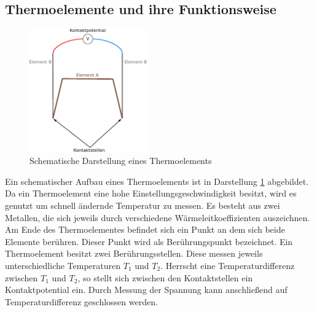 \subsection{Thermoelemente und ihre Funktionsweise} %
\begin{figure}
  \centering
  \includegraphics[width=0.45\textwidth]{bilder/thermoelement.pdf}
  \caption{Schematische Darstellung eines Thermoelements}
  \label{fig:thermo}
\end{figure}
Ein schematischer Aufbau eines Thermoelements ist in  Darstellung \ref{fig:thermo} %
abgebildet.
Da ein Thermoelement eine hohe Einstellungsgeschwindigkeit besitzt,
wird es genutzt um schnell ändernde Temperatur zu messen. %
Es besteht aus zwei Metallen, die sich jeweils durch
verschiedene Wärmeleitkoeffizienten auszeichnen.
Am Ende des Thermoelementes befindet sich ein Punkt an dem sich
beide Elemente berühren. Dieser Punkt wird als Berührungspunkt
bezeichnet.
Ein Thermoelement besitzt zwei Berührungsstellen.
Diese messen jeweils unterschiedliche Temperaturen $T_1$ und $T_2$.
Herrscht eine Temperaturdifferenz zwischen $T_1$ und $T_2$, so
stellt sich zwischen den Kontaktstellen ein Kontaktpotential %
ein.
Durch Messung der Spannung kann anschließend auf
Temperaturdifferenz geschlossen werden. %
